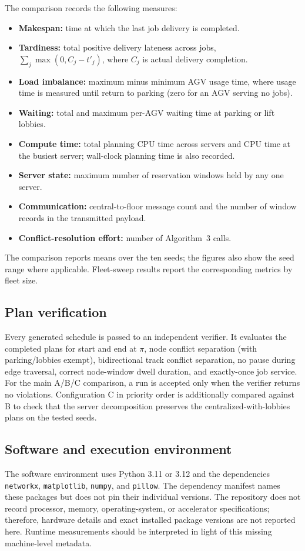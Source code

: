 The comparison records the following measures:
\begin{itemize}
  \item \textbf{Makespan:} time at which the last job delivery is completed.
  \item \textbf{Tardiness:} total positive delivery lateness across jobs,
        $\sum_j\max(0,C_j-t'_j)$, where $C_j$ is actual delivery completion.
  \item \textbf{Load imbalance:} maximum minus minimum AGV usage time, where
        usage time is measured until return to parking (zero for an AGV serving
        no jobs).
  \item \textbf{Waiting:} total and maximum per-AGV waiting time at parking
        or lift lobbies.
  \item \textbf{Compute time:} total planning CPU time across servers and CPU
        time at the busiest server; wall-clock planning time is also recorded.
  \item \textbf{Server state:} maximum number of reservation windows held by
        any one server.
  \item \textbf{Communication:} central-to-floor message count and the number
        of window records in the transmitted payload.
  \item \textbf{Conflict-resolution effort:} number of Algorithm~3 calls.
\end{itemize}

The comparison reports means over the ten seeds; the figures also show the
seed range where applicable. Fleet-sweep results report the corresponding
metrics by fleet size.

\subsection{Plan verification}

Every generated schedule is passed to an independent verifier. It evaluates the completed plans
for start and end at $\pi$, node conflict separation (with parking/lobbies
exempt), bidirectional track conflict separation, no pause during edge
traversal, correct node-window dwell duration, and exactly-once job service.
For the main A/B/C comparison, a run is accepted only when the verifier
returns no violations. Configuration C in priority order is additionally
compared against B to check that the server decomposition preserves the
centralized-with-lobbies plans on the tested seeds.

\subsection{Software and execution environment}

The software environment uses Python 3.11 or 3.12 and the dependencies
\texttt{networkx}, \texttt{matplotlib}, \texttt{numpy}, and \texttt{pillow}.
The dependency manifest names these
packages but does not pin their individual versions. The repository does not
record processor, memory, operating-system, or accelerator specifications;
therefore, hardware details and exact installed package versions are not
reported here. Runtime measurements should be interpreted in light of this
missing machine-level metadata.

